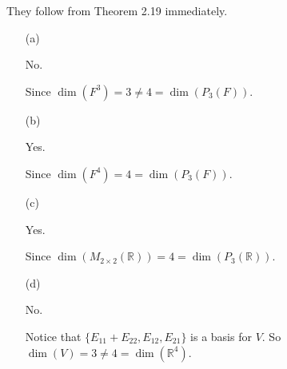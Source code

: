 \begin{Exercise}
	They follow from Theorem 2.19 immediately.
	\begin{enumerate}[(a)]
		\item[(a)]
		\begin{answer}
			No.
		\end{answer}
		\begin{solution}
			Since $\dim(F^3) = 3 \neq 4 = \dim(P_3(F))$.
		\end{solution}
		
		\item[(b)]
		\begin{answer}
			Yes.
		\end{answer}
		\begin{solution}
			Since $\dim(F^4) = 4 = \dim(P_3(F))$.
		\end{solution}
		
		\item[(c)]
		\begin{answer}
			Yes.
		\end{answer}
		\begin{solution}
			Since $\dim(M_{2\times 2}(\mathbb{R})) = 4 = \dim(P_3(\mathbb{R}))$.
		\end{solution}
		
		\item[(d)]
		\begin{answer}
			No.
		\end{answer}
		\begin{solution}
			Notice that $\{E_{1 1}+E_{2 2}, E_{1 2}, E_{2 1}\}$ is a basis for $V$. So $\dim(V) = 3 \neq 4 = \dim(\mathbb{R}^4)$.
		\end{solution}
		
	\end{enumerate}
\end{Exercise}